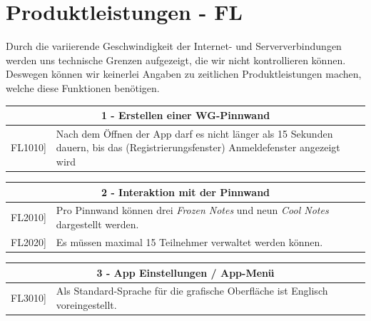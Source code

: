\documentclass[a4paper]{scrreprt}
\begin{document}
    		\vspace{1cm}
    		
    		\newpage
    		
    		\section{Produktleistungen - FL}
    		Durch die variierende Geschwindigkeit der Internet- und Serververbindungen werden uns technische Grenzen aufgezeigt, die wir nicht kontrollieren können. Deswegen können wir keinerlei Angaben zu zeitlichen Produktleistungen machen, welche diese Funktionen benötigen. 
    		\\
    		
    		\begin{table}[h!]
    			\centering
    			\label{my-label}
    			\begin{tabular}{p{2cm}p{12cm}}
    				
    				\multicolumn{2}{c}{\textbf{1 - Erstellen einer WG-Pinnwand}} \\ \hline
    				\centering{[}FL1010{]} & Nach dem Öffnen der App darf es nicht länger als 15 Sekunden dauern, bis das (Registrierungsfenster) Anmeldefenster angezeigt wird \\
    				\hline
    			\end{tabular}
    		\end{table}
    		
    		\vspace{5mm}
    		
    		\begin{table}[h!]
    			\centering
    			\label{my-label}
    			\begin{tabular}{p{2cm}p{12cm}}
    				
    				\multicolumn{2}{c}{\textbf{2 - Interaktion mit der Pinnwand}} \\ \hline
    				\centering{[}FL2010{]} & Pro Pinnwand können drei \textit{Frozen Notes} und neun \textit{Cool Notes} dargestellt werden.\\
    				\centering{[}FL2020{]}& Es müssen maximal 15 Teilnehmer verwaltet werden können.                             \\ 
    				\hline
    			\end{tabular}
    		\end{table}
    		
    		\vspace{5mm}
    		
    		\begin{table}[h!]
    			\centering
    			\label{my-label}
    			\begin{tabular}{p{2cm}p{12cm}}
    				
    				\multicolumn{2}{c}{\textbf{3 - App Einstellungen / App-Menü}} \\ \hline
    				\centering{[}FL3010{]} & Als Standard-Sprache für die grafische Oberfläche ist Englisch voreingestellt.\\
    				\hline
    			\end{tabular}
    		\end{table}
    		
\end{document}
